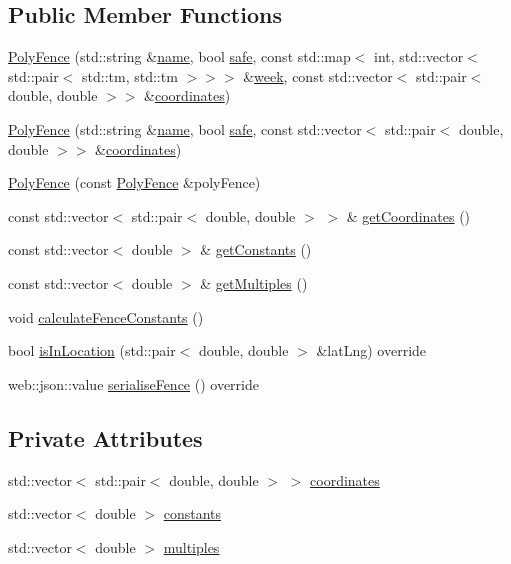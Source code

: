 \subsection*{Public Member Functions}
\begin{DoxyCompactItemize}
\item 
\hyperlink{class_poly_fence_a651e57a18ef757b31b5f6b54f7e081b9}{Poly\+Fence} (std\+::string \&\hyperlink{class_fence_aa405676733f25812b38ea0dd9ccd1863}{name}, bool \hyperlink{class_fence_ad570430040eee657c625a67d5589c4b5}{safe}, const std\+::map$<$ int, std\+::vector$<$ std\+::pair$<$ std\+::tm, std\+::tm $>$$>$$>$ \&\hyperlink{class_fence_ae589e973fa03316847aeceedd72e2b64}{week}, const std\+::vector$<$ std\+::pair$<$ double, double $>$$>$ \&\hyperlink{class_poly_fence_ae8e0c55e745979cab104ef80aeb4b418}{coordinates})
\item 
\hyperlink{class_poly_fence_a8468093f83237de375992d099727b93d}{Poly\+Fence} (std\+::string \&\hyperlink{class_fence_aa405676733f25812b38ea0dd9ccd1863}{name}, bool \hyperlink{class_fence_ad570430040eee657c625a67d5589c4b5}{safe}, const std\+::vector$<$ std\+::pair$<$ double, double $>$$>$ \&\hyperlink{class_poly_fence_ae8e0c55e745979cab104ef80aeb4b418}{coordinates})
\item 
\hyperlink{class_poly_fence_ad95391c8cf7de0e39cb704cfe771101e}{Poly\+Fence} (const \hyperlink{class_poly_fence}{Poly\+Fence} \&poly\+Fence)
\item 
const std\+::vector$<$ std\+::pair$<$ double, double $>$ $>$ \& \hyperlink{class_poly_fence_ac21701adcb8af5b77872d7659318af72}{get\+Coordinates} ()
\item 
const std\+::vector$<$ double $>$ \& \hyperlink{class_poly_fence_a8eb326a3ea522915ee2d343e838730d8}{get\+Constants} ()
\item 
const std\+::vector$<$ double $>$ \& \hyperlink{class_poly_fence_a2d67b5087a07fabcec9d3d240df6c417}{get\+Multiples} ()
\item 
void \hyperlink{class_poly_fence_a229de6f5987bf7d312310b522db0d5a4}{calculate\+Fence\+Constants} ()
\item 
bool \hyperlink{class_poly_fence_af8116af5be86f8426102985c3dbcdf5e}{is\+In\+Location} (std\+::pair$<$ double, double $>$ \&lat\+Lng) override
\item 
web\+::json\+::value \hyperlink{class_poly_fence_ae748da10e4fd15f87b74e0d996f00103}{serialise\+Fence} () override
\end{DoxyCompactItemize}
\subsection*{Private Attributes}
\begin{DoxyCompactItemize}
\item 
std\+::vector$<$ std\+::pair$<$ double, double $>$ $>$ \hyperlink{class_poly_fence_ae8e0c55e745979cab104ef80aeb4b418}{coordinates}
\item 
std\+::vector$<$ double $>$ \hyperlink{class_poly_fence_a24c99bb8a45f86bdf51cd3f22ef0f174}{constants}
\item 
std\+::vector$<$ double $>$ \hyperlink{class_poly_fence_a2204e62b61b0e3c335734fa0b6cf0728}{multiples}
\end{DoxyCompactItemize}


